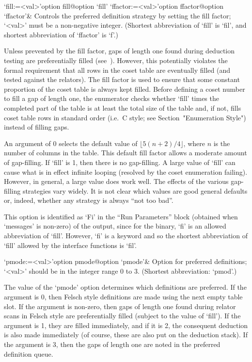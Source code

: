 \beginitems

\>`fill:=<val>'{option fill}@{option `fill'}
\>`ffactor:=<val>'{option ffactor}@{option `ffactor'}&
Controls the preferred definition strategy by setting the fill factor;
`<val>' must be a non-negative integer.
(Shortest abbreviation of `fill' is `fil', and  shortest  abbreviation
of `ffactor' is `f'.)

Unless prevented by the fill factor, gaps of length one  found  during
deduction  testing  are  preferentially   filled   (see~\cite{Hav91}).
However, this potentially violates the  formal  requirement  that  all
rows in the coset table are eventually filled (and tested against  the
relators). The fill factor  is  used  to  ensure  that  some  constant
proportion of the coset table is always kept filled. Before defining a
coset number to fill a  gap  of  length  one,  the  enumerator  checks
whether `fill' times the completed part of the table is at  least  the
total size of the table  and,  if  not,  fills  coset  table  rows  in
standard order (i.e.~C style; see Section~"Enumeration Style") instead
of filling gaps.

An  argument of  0  selects  the default  value  of $\lfloor  5(n+2)/4
\rfloor$,  where $n$  is the  number of  columns in  the  table.  This
default  fill factor  allows  a moderate  amount  of gap-filling.   If
`fill' is  1, then there is  no gap-filling.  A large  value of `fill'
can cause  what is in effect  infinite looping (resolved  by the coset
enumeration failing).   However, in general,  a large value  does work
well.  The  effects of the various gap-filling  strategies vary widely.
It is  not clear  which values are  good general defaults  or, indeed,
whether any strategy is always ``not too bad''.

This option is identified as `Fi'  in  the  ``Run  Parameters''  block
(obtained when `messages' is non-zero) of the {\ACE} output, since for
the {\ACE} binary, `fi' is an allowed abbreviation of `fill'. However,
`fi' is a {\GAP} keyword and so the shortest  abbreviation  of  `fill'
allowed by the interface functions is `fil'.

\>`pmode:=<val>'{option pmode}@{option `pmode'}&
Option for preferred definitions; `<val>' should  be  in  the  integer
range 0 to 3. (Shortest abbreviation: `pmod'.)

The  value of  the  `pmode' option  determines  which definitions  are
preferred.  If  the argument is  0, then Felsch style  definitions are
made using  the next empty table  slot.  If the  argument is non-zero,
then gaps of length one found during relator scans in Felsch style are
preferentially  filled  (subject to  the  value  of  `fill').  If  the
argument  is 1,  they are  filled  immediately, and  if it  is 2,  the
consequent deduction  is also made  immediately (of course,  these are
also put on the deduction stack).  If the argument is 3, then the gaps
of length one are noted in the preferred definition queue.

